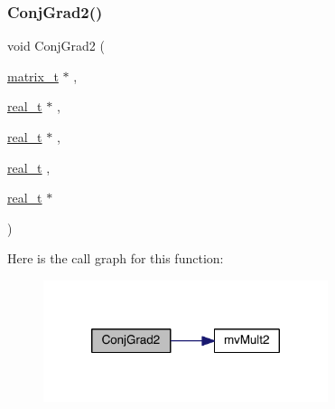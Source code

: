 \mbox{\label{a00951_a061b7c3be4d3cd3890504c528511e2c6}} 
\subsubsection{\texorpdfstring{Conj\+Grad2()}{ConjGrad2()}}
{\footnotesize\ttfamily void Conj\+Grad2 (\begin{DoxyParamCaption}\item[{\hyperlink{a00754}{matrix\+\_\+t} $\ast$}]{,  }\item[{\hyperlink{a00876_a1924a4f6907cc3833213aba1f07fcbe9}{real\+\_\+t} $\ast$}]{,  }\item[{\hyperlink{a00876_a1924a4f6907cc3833213aba1f07fcbe9}{real\+\_\+t} $\ast$}]{,  }\item[{\hyperlink{a00876_a1924a4f6907cc3833213aba1f07fcbe9}{real\+\_\+t}}]{,  }\item[{\hyperlink{a00876_a1924a4f6907cc3833213aba1f07fcbe9}{real\+\_\+t} $\ast$}]{ }\end{DoxyParamCaption})}

Here is the call graph for this function\+:\nopagebreak
\begin{figure}[H]
\begin{center}
\leavevmode
\includegraphics[width=236pt]{a00951_a061b7c3be4d3cd3890504c528511e2c6_cgraph}
\end{center}
\end{figure}
\mbox{\label{a00951_a609f294092e61b4b29d44fe278969e83}} 
